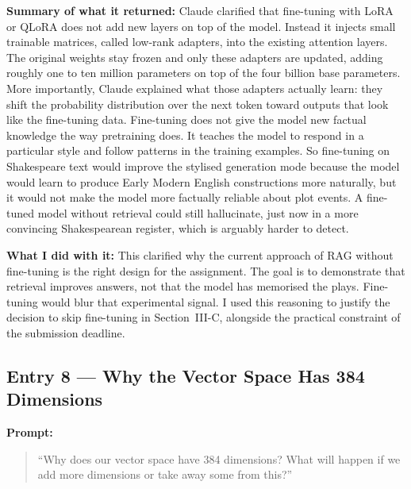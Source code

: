 \documentclass[10pt,conference]{IEEEtran}
\begin{document}
\textbf{Summary of what it returned:}
Claude clarified that fine-tuning with LoRA or QLoRA does not add new
layers on top of the model. Instead it injects small trainable matrices,
called low-rank adapters, into the existing attention layers. The
original weights stay frozen and only these adapters are updated, adding
roughly one to ten million parameters on top of the four billion base
parameters. More importantly, Claude explained what those adapters
actually learn: they shift the probability distribution over the next
token toward outputs that look like the fine-tuning data. Fine-tuning
does not give the model new factual knowledge the way pretraining does.
It teaches the model to respond in a particular style and follow patterns
in the training examples. So fine-tuning on Shakespeare text would
improve the stylised generation mode because the model would learn to
produce Early Modern English constructions more naturally, but it would
not make the model more factually reliable about plot events. A
fine-tuned model without retrieval could still hallucinate, just now in
a more convincing Shakespearean register, which is arguably harder to
detect.

\textbf{What I did with it:}
This clarified why the current approach of RAG without fine-tuning is
the right design for the assignment. The goal is to demonstrate that
retrieval improves answers, not that the model has memorised the plays.
Fine-tuning would blur that experimental signal. I used this reasoning
to justify the decision to skip fine-tuning in Section~III-C, alongside
the practical constraint of the submission deadline.


\subsection*{Entry 8 --- Why the Vector Space Has 384 Dimensions}

\textbf{Prompt:}
\begin{quote}
``Why does our vector space have 384 dimensions? What will happen
if we add more dimensions or take away some from this?''
\end{quote}
\end{document}

